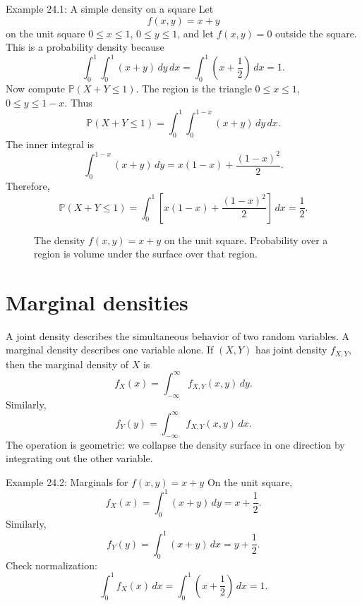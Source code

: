 \documentclass[11pt,oneside]{book}
\newcommand{\Prob}{\mathbb P}
\newcommand{\dd}{\,d}
\begin{document}
\begin{examplebox}{Example 24.1: A simple density on a square}
Let
\[
f(x,y)=x+y
\]
on the unit square $0\le x\le 1$, $0\le y\le 1$, and let $f(x,y)=0$ outside the square. This is a probability density because
\[
\int_0^1\int_0^1(x+y)\dd y\dd x
=\int_0^1\left(x+\frac12\right)\dd x=1.
\]
Now compute $\Prob(X+Y\le 1)$. The region is the triangle $0\le x\le 1$, $0\le y\le 1-x$. Thus
\[
\Prob(X+Y\le 1)=\int_0^1\int_0^{1-x}(x+y)\dd y\dd x.
\]
The inner integral is
\[
\int_0^{1-x}(x+y)\dd y=x(1-x)+\frac{(1-x)^2}{2}.
\]
Therefore,
\[
\Prob(X+Y\le 1)=\int_0^1\left[x(1-x)+\frac{(1-x)^2}{2}\right]\dd x=\frac12.
\]
\end{examplebox}

\begin{figure}[H]
\centering
{}
\caption{The density $f(x,y)=x+y$ on the unit square. Probability over a region is volume under the surface over that region.}
\end{figure}

\section{Marginal densities}

A joint density describes the simultaneous behavior of two random variables. A marginal density describes one variable alone. If $(X,Y)$ has joint density $f_{X,Y}$, then the marginal density of $X$ is
\[
f_X(x)=\int_{-\infty}^{\infty} f_{X,Y}(x,y)\dd y.
\]
Similarly,
\[
f_Y(y)=\int_{-\infty}^{\infty} f_{X,Y}(x,y)\dd x.
\]
The operation is geometric: we collapse the density surface in one direction by integrating out the other variable.

\begin{examplebox}{Example 24.2: Marginals for $f(x,y)=x+y$}
On the unit square,
\[
f_X(x)=\int_0^1(x+y)\dd y=x+\frac12.
\]
Similarly,
\[
f_Y(y)=\int_0^1(x+y)\dd x=y+\frac12.
\]
Check normalization:
\[
\int_0^1 f_X(x)\dd x=\int_0^1\left(x+\frac12\right)\dd x=1.
\]
\end{examplebox}
\end{document}
